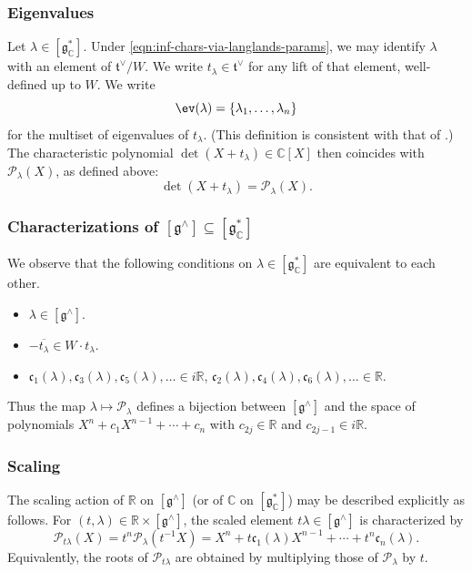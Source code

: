 \subsubsection{Eigenvalues}
Let $\lambda \in [\mathfrak{g}_\mathbb{C}^*]$.  Under \eqref{eqn:inf-chars-via-langlands-params}, we may identify $\lambda$ with an element of $\mathfrak{t}^\vee/W$.  We write $t_\lambda \in \mathfrak{t}^\vee$ for any lift of that element, well-defined up to $W$.  We write
\begin{equation*}
  \ev(\lambda) = \{\lambda_1,\dotsc,\lambda_n\}
\end{equation*}
for the multiset  of eigenvalues of $t_\lambda$.  (This definition is consistent with that of \cite[\S13.4.1]{nelson-venkatesh-1}.)  The characteristic polynomial $\det(X + t_\lambda) \in \mathbb{C}[X]$ then coincides with $\mathcal{P}_\lambda(X)$, as defined above:
\begin{equation}\label{eq:detx-+-t_lambda}
  \det(X + t_\lambda) = \mathcal{P}_{\lambda}(X).
\end{equation}

\subsubsection{Characterizations of $[\mathfrak{g}^\wedge] \subseteq [\mathfrak{g}_{\mathbb{C}}^*]$}
We observe that the following conditions on $\lambda \in [\mathfrak{g}_\mathbb{C}^*]$ are equivalent to each other.
\begin{itemize}
\item $\lambda \in [\mathfrak{g}^\wedge]$.
\item $- \overline{t_\lambda} \in W \cdot t_\lambda$.
\item $\mathfrak{c}_1(\lambda), \mathfrak{c}_3(\lambda), \mathfrak{c}_5(\lambda), \dotsc \in i \mathbb{R}$, $\mathfrak{c}_2(\lambda), \mathfrak{c}_4(\lambda), \mathfrak{c}_6(\lambda), \dotsc \in \mathbb{R}$.
\end{itemize}
Thus the map $\lambda \mapsto \mathcal{P}_\lambda$ defines a bijection between $[\mathfrak{g}^\wedge]$ and the space of polynomials $X^n + c_1 X^{n-1} + \dotsb + c_n$ with $c_{2 j} \in \mathbb{R}$ and $c_{2j - 1} \in i \mathbb{R}$.


\subsubsection{Scaling}
The scaling action of $\mathbb{R}$ on $[\mathfrak{g}^\wedge]$ (or of $\mathbb{C}$ on $[\mathfrak{g}_{\mathbb{C}}^*]$) may be described explicitly as follows.  For $(t,\lambda) \in \mathbb{R} \times [\mathfrak{g}^\wedge]$, the scaled element $t \lambda \in [\mathfrak{g}^\wedge]$ is characterized by
\begin{equation}\label{eq:cal-P-t-lambda}
  \mathcal{P}_{t \lambda}(X) = t^{n} \mathcal{P}_{\lambda}(t^{-1} X)
  =
  X^n + t \mathfrak{c}_1(\lambda) X^{n-1} + \dotsb + t^n \mathfrak{c}_n(\lambda).
\end{equation}
Equivalently, the roots of $\mathcal{P}_{t \lambda}$ are obtained by multiplying those of $\mathcal{P}_{\lambda}$ by $t$.


